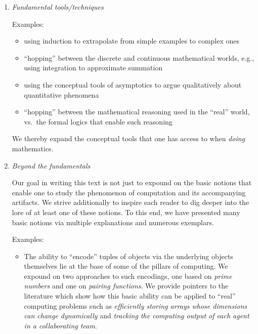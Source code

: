 \begin{enumerate}
\medskip

\item
{\it Fundamental tools/techniques}

\medskip

{\small\sf Examples:}
\begin{itemize}
\item
using induction to extrapolate from simple examples to complex ones
\item
``hopping'' between the discrete and continuous mathematical worlds,
e.g., using integration to approximate summation
\item
using the conceptual tools of asymptotics to argue qualitatively about
quantitative phenomena
\item
``hopping'' between the mathematical reasoning used in the ``real''
  world, vs.~the formal logics that enable such reasoning
\end{itemize}
We thereby expand the conceptual tools that one has access to when
{\em doing} mathematics.

\medskip

\item
{\it Beyond the fundamentals}

Our goal in writing this text is not just to expound on the basic
notions that enable one to study the phenomenon of computation and its
accompanying artifacts.  We strive additionally to inspire each reader
to dig deeper into the lore of at least one of these notions. To this
end, we have presented many basic notions via multiple explanations
and numerous exemplars.

\medskip

{\small\sf Examples:}
\begin{itemize}
\item
The ability to ``encode'' tuples of objects via the underlying objects
themselves lie at the base of some of the pillars of computing.  We
expound on two approaches to such encodings, one based on {\em prime
  numbers} and one on {\em pairing functions}.  We provide pointers to
the literature which show how this basic ability can be applied to
``real'' computing problems such as {\em efficiently storing arrays
  whose dimensions can change dynamically} and {\em tracking the
  computing output of each agent in a collaborating team}.


\end{itemize}
\end{enumerate}
